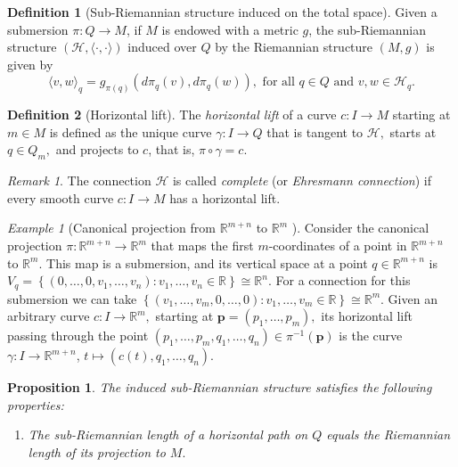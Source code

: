 \documentclass [xcolor=svgnames, t] {beamer}
\theoremstyle{definition}
\newtheorem{df}{Definition}
\theoremstyle{plain}
\newtheorem{prop}{Proposition}
\theoremstyle{remark}
\newtheorem{ex}{Example}
\newtheorem{rem}{Remark}
\begin{document}
\begin{frame}[allowframebreaks]
	\begin{df}[Sub-Riemannian structure induced on the total space]
	Given a submersion $ \pi: Q \rightarrow M $, if $ M $ is endowed with a metric $ g $, the sub-Riemannian structure $ (\mathcal{H},\langle \cdot, \cdot\rangle) $ induced over $ Q $  by the Riemannian structure $ (M,g) $ is given by
$$ \langle v,w \rangle_q = g_{\pi(q)} \left( d\pi_q(v), d\pi_q(w) \right), \text{ for all }q\in Q \text{ and } v,w\in \mathcal{H}_q.   $$ 
	\end{df}
	\begin{df}[Horizontal lift]
	The \textit{horizontal lift} of a curve $ c: I \rightarrow {M} $ starting at $ m\in M $ is defined as the unique curve $ \gamma : I \rightarrow {Q} $ that is tangent to $ \mathcal{H}, $ starts at $ q\in Q_m, $ and projects to $c$, that is, $ \pi\circ\gamma = c. $ 
	\end{df}
\begin{rem}
	The connection $ \mathcal{H} $ is called \textit{complete} (or \textit{Ehresmann connection})  if every smooth curve $ c: I \rightarrow {M} $ has a horizontal lift.
\end{rem}
\begin{ex}[Canonical projection from $ \mathbb{R}^{m+n} $ to $ \mathbb{R}^m $  ]\label{ex:can_proj}
	\sloppy	Consider the canonical projection $ \pi: \mathbb{R}^{m+n} \rightarrow \mathbb{R}^m $ that maps the first $ m $-coordinates of a point in $ \mathbb{R}^{m+n} $  to $ \mathbb{R}^m. $ This map is a submersion, and its vertical space at a point $ q\in \mathbb{R}^{m+n} $ is $ V_q = \left\{ (0,\dots,0,v_1,\dots,v_n) : v_1,\dots,v_n\in \mathbb{R}  \right\} \cong \mathbb{R}^n. $ For a connection for this submersion we can take $ \left\{ (v_1,\dots,v_m, 0,\dots, 0): v_1,\dots,v_m\in \mathbb{R} \right\}\cong \mathbb{R}^m.  $ Given an arbitrary curve $ c: I \rightarrow \mathbb{R}^m, $ starting at $ \boldsymbol{p}= (p_1,\dots,p_m), $ its horizontal lift passing through the point $ (p_1,\dots,p_m,q_1,\dots,q_n)\in \pi^{-1}( \boldsymbol{p} ) $ is the curve $ \gamma: I \rightarrow \mathbb{R}^{m+n} $, $ t\mapsto (c(t),q_1,\dots,q_n). $   
\end{ex}
\begin{prop}
	The induced sub-Riemannian structure satisfies the following properties:
	\begin{enumerate}
		\item The sub-Riemannian length of a horizontal path on $ Q $ equals the Riemannian length of its projection to $ M. $ 

\end{enumerate}
\end{prop}
\end{frame}
\end{document}
